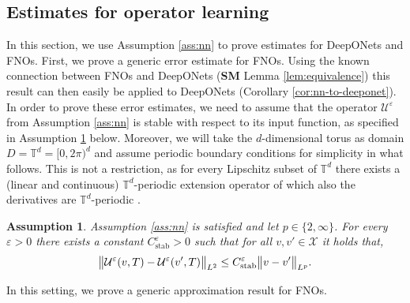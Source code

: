 \documentclass{article}
\numberwithin{equation}{section}
\newcommand{\T}{\mathbb{T}}
\newcommand{\cU}{\mathcal{U}}
\newcommand{\cX}{\mathcal{X}}
\renewcommand{\epsilon}{\varepsilon}
\newcommand{\1}{\mathbbm{1}}
\newtheorem{assumption}[theorem]{Assumption}
\begin{document}
\subsection{Estimates for operator learning}\label{sec:fourier}

In this section, we use Assumption \ref{ass:nn} to prove estimates for DeepONets and FNOs. First, we prove a generic error estimate for FNOs. Using the known connection between FNOs and DeepONets ({\bf SM} Lemma \ref{lem:equivalence}) this result can then easily be applied to DeepONets
(Corollary \ref{cor:nn-to-deeponet}). %
In order to prove these error estimates, we need to assume that the operator $\cU^\epsilon$ from Assumption \ref{ass:nn} is stable with respect to its input function, as specified in Assumption \ref{ass:stability} below. Moreover, we will take the $d$-dimensional torus as domain $D=\T^d = [0,2\pi)^d$ and assume periodic boundary conditions for simplicity in what follows. This is not a restriction, as for every Lipschitz subset of $\T^d$ there exists a (linear and continuous) $\T^d$-periodic extension operator of which also the derivatives are $\T^d$-periodic \cite[Lemma 41]{kovachki2021universal}. 
\begin{assumption}\label{ass:stability}
Assumption \ref{ass:nn} is satisfied and let $p\in\{2,\infty\}$. For every $\epsilon>0$ there exists a constant $C^\epsilon_{\mathrm{stab}}>0$ such that for all $v,v'\in \cX$ it holds that,
\begin{equation}
    \norm{\cU^\epsilon(v,T)-\cU^\epsilon(v',T)}_{L^2}\leq C^\epsilon_{\mathrm{stab}} \norm{v-v'}_{L^p}. 
\end{equation}
\end{assumption}

In this setting, we prove a generic approximation result for FNOs. 
\end{document}
